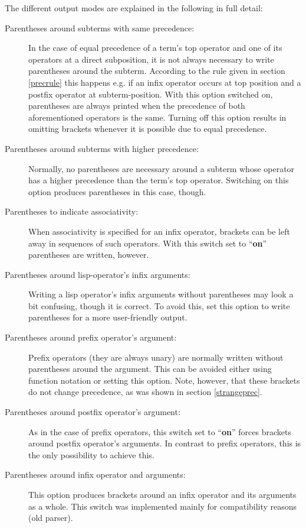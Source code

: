The different output modes are explained in the following in full detail:
\begin{description}
\item[Parentheses around subterms with same precedence:]
  In the case of equal precedence of a term's top operator and one
  of its operators at a direct subposition, it is not always necessary
  to write parentheses around the subterm. According to the rule given in
  section \ref{precrule} this happens e.g. if an infix operator occurs at top
  position and a postfix operator at subterm-position.
  With this option switched on, parentheses are always printed when
  the precedence of both aforementioned operators is the same.
  Turning off this option results in omitting brackets whenever it is possible
  due to equal precedence.
\item[Parentheses around subterms with higher precedence:]
  Normally, no parentheses are necessary around a subterm whose operator
  has a higher precedence than the term's top operator. Switching on this
  option produces parentheses in this case, though.
\item[Parentheses to indicate associativity:] When associativity is specified
  for an infix operator, brackets can be left away in sequences of such
  operators. With this switch set to ``{\bf on}'' parentheses are written, however.
\item[Parentheses around lisp-operator's infix arguments:] Writing a lisp
  operator's infix arguments without parentheses may look a bit confusing, though
  it is correct. To avoid this, set this option to write parentheses for a more
  user-friendly output.
\item[Parentheses around prefix operator's argument:] Prefix operators (they
  are always unary) are normally written without parentheses around the argument.
  This can be avoided either using function notation or setting this option.
  Note, however, that these brackets do not change precedence, as was shown in
  section \ref{strangeprec}.
\item[Parentheses around postfix operator's argument:] As in the case of prefix
  operators, this switch set to ``{\bf on}'' forces brackets around postfix operator's
  arguments. In contrast to prefix operators, this is the only possibility to
  achieve this.
\item[Parentheses around infix operator and arguments:] This option produces
  brackets around an infix operator and its arguments as a whole. This switch
  was implemented mainly for compatibility reasons (old parser).

\end{description}
